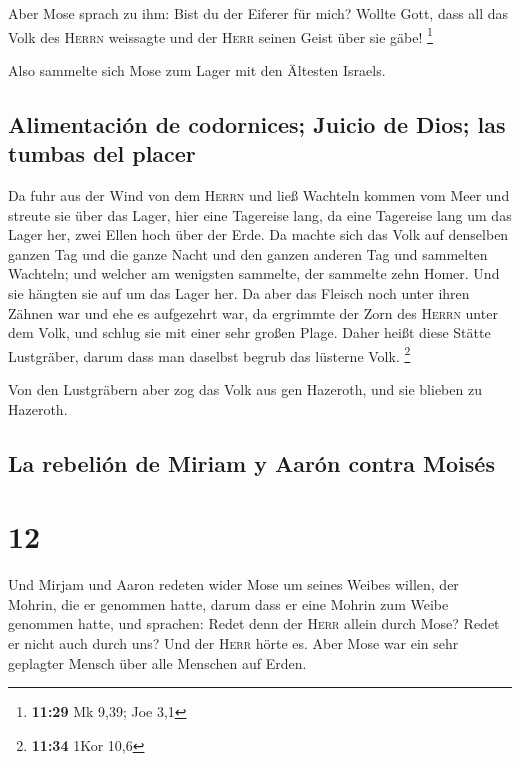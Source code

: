  Aber Mose sprach zu ihm: Bist du der Eiferer für mich?
Wollte Gott, dass all das Volk des \textsc{Herrn} weissagte und der
\textsc{Herr} seinen Geist über sie gäbe! \footnote{\textbf{11:29} Mk
  9,39; Joe 3,1}

 Also sammelte sich Mose zum Lager mit den Ältesten
Israels.

\hypertarget{alimentaciuxf3n-de-codornices-juicio-de-dios-las-tumbas-del-placer}{%
\subsection{Alimentación de codornices; Juicio de Dios; las tumbas del
placer}\label{alimentaciuxf3n-de-codornices-juicio-de-dios-las-tumbas-del-placer}}

 Da fuhr aus der Wind von dem \textsc{Herrn} und ließ
Wachteln kommen vom Meer und streute sie über das Lager, hier eine
Tagereise lang, da eine Tagereise lang um das Lager her, zwei Ellen hoch
über der Erde.  Da machte sich das Volk auf denselben
ganzen Tag und die ganze Nacht und den ganzen anderen Tag und sammelten
Wachteln; und welcher am wenigsten sammelte, der sammelte zehn Homer.
Und sie hängten sie auf um das Lager her.  Da aber das
Fleisch noch unter ihren Zähnen war und ehe es aufgezehrt war, da
ergrimmte der Zorn des \textsc{Herrn} unter dem Volk, und schlug sie mit
einer sehr großen Plage.  Daher heißt diese Stätte
Lustgräber, darum dass man daselbst begrub das lüsterne Volk.
\footnote{\textbf{11:34} 1Kor 10,6}

 Von den Lustgräbern aber zog das Volk aus gen Hazeroth,
und sie blieben zu Hazeroth.

\hypertarget{la-rebeliuxf3n-de-miriam-y-aaruxf3n-contra-moisuxe9s}{%
\subsection{La rebelión de Miriam y Aarón contra
Moisés}\label{la-rebeliuxf3n-de-miriam-y-aaruxf3n-contra-moisuxe9s}}

\hypertarget{section-11}{%
\section{12}\label{section-11}}

 Und Mirjam und Aaron redeten wider Mose um seines Weibes
willen, der Mohrin, die er genommen hatte, darum dass er eine Mohrin zum
Weibe genommen hatte,  und sprachen: Redet denn der
\textsc{Herr} allein durch Mose? Redet er nicht auch durch uns? Und der
\textsc{Herr} hörte es.  Aber Mose war ein sehr geplagter
Mensch über alle Menschen auf Erden.

